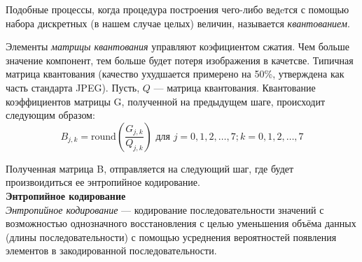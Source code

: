 \documentclass{matmex-diploma-custom}
\begin{document}
Подобные процессы, когда процедура построения чего-либо ведeтся с помощью набора дискретных (в нашем случае целых) величин, называется \emph{квантованием}.

Элементы \emph{матрицы квантования} управляют коэфициентом сжатия. Чем больше значение компонент, тем больше будет потеря изображения в качетсве. Типичная матрица квантования (качество ухудшается примерено на 50\%, утверждена как часть стандарта JPEG).
Пусть, $Q$ --- матрица квантования. Квантование коэффициентов матрицы  G, полученной на предыдущем шаге, происходит следующим образом:
$$B_{j,k} = \mathrm{round} \left( \frac{G_{j,k}}{Q_{j,k}} \right) \mbox{ для } j=0,1,2,\ldots,7; k=0,1,2,\ldots,7$$


  Полученная матрица B, отправляется на следующий шаг, где будет произвоидиться ее энтропийное кодирование.\\

\textbf{Энтропийное кодирование}\\

\emph{Энтропийное кодирование} — кодирование последовательности значений с возможностью однозначного восстановления с целью уменьшения объёма данных (длины последовательности) с помощью усреднения вероятностей появления элементов в закодированной последовательности.
\end{document}
